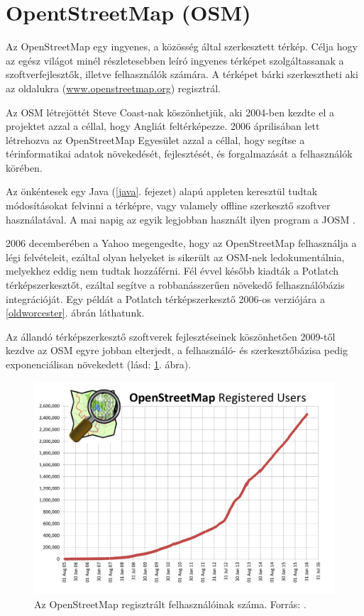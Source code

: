 \documentclass[a4paper,12pt]{report}
\begin{document}
\newpage
\section{OpentStreetMap (OSM)}
\label{osm}

Az OpenStreetMap egy ingyenes, a közösség által szerkesztett térkép. Célja hogy az egész világot minél részletesebben leíró ingyenes térképet szolgáltassanak a szoftverfejlesztők, illetve felhasználók számára. A térképet bárki szerkesztheti aki az oldalukra (\url{www.openstreetmap.org}) regisztrál. 

\vspace{2mm}
Az OSM létrejöttét Steve Coast-nak köszönhetjük, aki 2004-ben kezdte el a projektet azzal a céllal, hogy Angliát feltérképezze. 2006 áprilisában lett létrehozva az OpenStreetMap Egyesület azzal a céllal, hogy segítse a térinformatikai adatok növekedését, fejlesztését, és forgalmazását a felhasználók körében.

\vspace{2mm}
Az önkéntesek egy Java (\ref{java}. fejezet) alapú appleten keresztül tudtak módosításokat felvinni a térképre, vagy valamely offline szerkesztő szoftver használatával. A mai napig az egyik legjobban használt ilyen program a JOSM \cite{josm}.

\vspace{2mm}
2006 decemberében a Yahoo megengedte, hogy az OpenStreetMap felhasználja a légi felvételeit, ezáltal olyan helyeket is sikerült az OSM-nek ledokumentálnia, melyekhez eddig nem tudtak hozzáférni. Fél évvel később kiadták a Potlatch \cite{potlatch} térképszerkesztőt, ezáltal segítve a robbanásszerűen növekedő felhasználóbázis integrációját. Egy példát a Potlatch térképszerkesztő 2006-os verziójára a \ref{oldworcester}. ábrán láthatunk.

\newpage
Az állandó térképszerkesztő szoftverek fejlesztéseinek köszönhetően 2009-től kezdve az OSM egyre jobban elterjedt, a felhasználó- és szerkesztőbázisa pedig exponenciálisan növekedett (lásd: \ref{osmusers}. ábra).

\begin{figure}[ht]
\centerline{
\includegraphics[width=5.5in]{img/osmusers}}
\caption{Az OpenStreetMap regisztrált felhasználóinak száma. Forrás: \cite{osmhistory}.}
\label{osmusers}
\end{figure}
\end{document}
